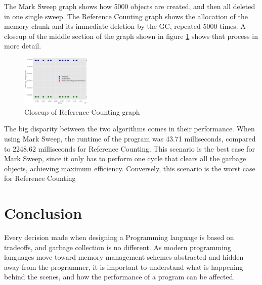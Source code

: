 \documentclass[10pt]{extarticle}
\begin{document}
The Mark Sweep graph shows how 5000 objects are created, and then all deleted in one single sweep. The Reference Counting graph shows the allocation of the memory chunk and its immediate deletion by the GC, repeated 5000 times. A closeup of the middle section of the graph shown in figure \ref{fig:refcounting_delayed_close} shows that process in more detail.

\begin{figure}
    \vspace{-\baselineskip}
    \begin{center}
        \includegraphics[width=0.29\textwidth]{refcounting_delayed_close.png}
    \end{center}
    \caption{Closeup of Reference Counting graph}
    \label{fig:refcounting_delayed_close}
  \end{figure}



\medskip
The big disparity between the two algorithms comes in their performance. When using Mark Sweep, the runtime of the program was 43.71 milliseconds, compared to 2248.62 milliseconds for Reference Counting. This scenario is the best case for Mark Sweep, since it only has to perform one cycle that clears all the garbage objects, achieving maximum efficiency. Conversely, this scenario is the worst case for Reference Counting 

\clearpage
\newpage 

\section{Conclusion}

Every decision made when designing a Programming language is based on tradeoffs, and garbage collection is no different. As modern programming languages move toward memory management schemes abstracted and hidden away from the programmer, it is important to understand what is happening behind the scenes, and how the performance of a program can be affected. 
\end{document}
